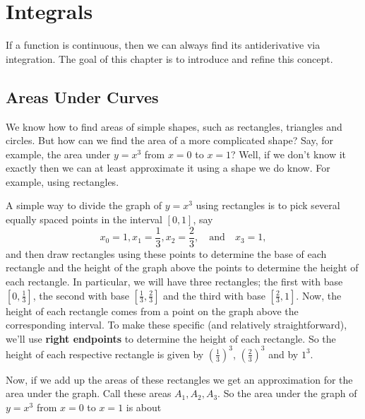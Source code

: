 \documentclass[10pt,]{book}
\newcommand{\terminology}[1]{\textbf{#1}}
\numberwithin{equation}{section}
\begin{document}
\chapter[{Integrals}]{Integrals}\label{integrals}
\begin{introduction}{}%
\hypertarget{p-401}{}%
If a function is continuous, then we can always find its antiderivative via integration. The goal of this chapter is to introduce and refine this concept.%
\end{introduction}%
%
%
\typeout{************************************************}
\typeout{************************************************}
%
\section[{Areas Under Curves}]{Areas Under Curves}\label{section-areas-under-curves}
\hypertarget{p-402}{}%
We know how to find areas of simple shapes, such as rectangles, triangles and circles. But how can we find the area of a more complicated shape? Say, for example, the area under \(y=x^{3}\) from \(x=0\) to \(x=1\)? Well, if we don't know it exactly then we can at least approximate it using a shape we do know. For example, using rectangles.%
\par
\hypertarget{p-403}{}%
A simple way to divide the graph of \(y=x^{3}\) using rectangles is to pick several equally spaced points in the interval \([0,1]\), say%
\begin{equation*}
x_{0} = 1, x_{1} = \frac{1}{3}, x_{2} = \frac{2}{3}, \quad\text{and}\quad x_{3} = 1,
\end{equation*}
and then draw rectangles using these points to determine the base of each rectangle and the height of the graph above the points to determine the height of each rectangle. In particular, we will have three rectangles; the first with base \([0,\frac{1}{3}]\), the second with base \([\frac{1}{3},\frac{2}{3}]\) and the third with base \([\frac{2}{3},1]\). Now, the height of each rectangle comes from a point on the graph above the corresponding interval. To make these specific (and relatively straightforward), we'll use \terminology{right endpoints} to determine the height of each rectangle. So the height of each respective rectangle is given by \((\frac{1}{3})^{3}\), \((\frac{2}{3})^{3}\) and by \(1^{3}\).%
\par
\hypertarget{p-404}{}%
Now, if we add up the areas of these rectangles we get an approximation for the area under the graph. Call these areas \(A_{1},A_{2},A_{3}\). So the area under the graph of \(y = x^{3}\) from \(x=0\) to \(x=1\) is about%
\end{document}
